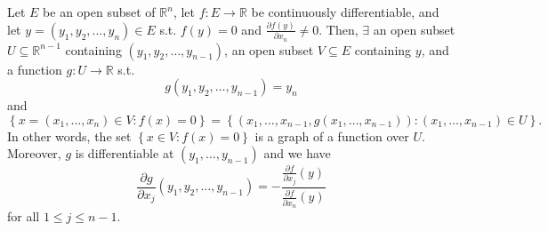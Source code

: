 \begin{center}
\end{center}

\begin{theorem}
    Let \(E\) be an open subset of \(\mathbb{R} ^n\), let \(f:E \to \mathbb{R} \) be continuously differentiable, and let \(y = (y_1, y_2, \dots , y_n) \in E\) s.t. \(f(y) = 0\) and \(\frac{\partial f(y)}{\partial x_n} \neq 0\). Then, \(\exists \) an open subset \(U \subseteq \mathbb{R} ^{n-1}\) containing \((y_1, y_2, \dots , y_{n-1})\), an open subset \(V \subseteq E\) containing \(y\), and a function \(g: U \to \mathbb{R} \) s.t.
    \[
        g(y_1, y_2, \dots , y_{n-1}) = y_n
    \]          
    and 
    \[
        \left\{ x = (x_1, \dots , x_n) \in V: f(x) = 0 \right\} = \left\{ (x_1, \dots , x_{n-1}, g(x_1, \dots , x_{n-1})) : (x_1, \dots ,x_{n-1}) \in U \right\}.  
    \]
    In other words, the set \(\left\{ x \in V: f(x) = 0 \right\} \) is a graph of a function over \(U\). Moreover, \(g\) is differentiable at \((y_1, \dots , y_{n-1})\) and we have 
    \[
        \frac{\partial g}{\partial x_{j} } (y_1, y_2, \dots , y_{n-1}) = -\frac{\frac{\partial f}{\partial x_j}(y) }{\frac{\partial f}{\partial x_n}(y) } 
    \]    
    for all \(1 \le j \le n - 1\). 
\end{theorem}

